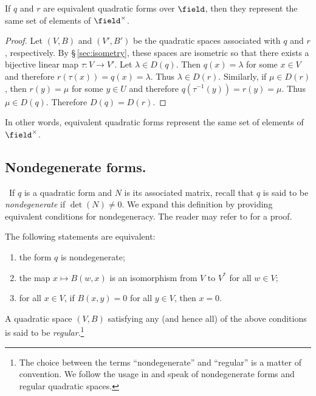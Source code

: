\begin{theorem}
  If \(q\) and \(r\) are equivalent quadratic forms over \(\field\), then they represent the same set of elements of \(\field^{\times}\).
\end{theorem}

\begin{proof}
  Let \((V, B)\) and \((V', B')\) be the quadratic spaces associated with \(q\) and \(r\), respectively. By \S\,\ref{sec:isometry}, these spaces are isometric so that there exists a bijective linear map \(\tau: V \to V'\). Let \(\lambda \in D(q)\). Then \(q(x) = \lambda\) for some \(x \in V\) and therefore \(r(\tau(x)) = q(x) = \lambda\). Thus \(\lambda \in D(r)\). Similarly, if \(\mu \in D(r)\), then \(r(y) = \mu\) for some \(y \in U\) and therefore \(q(\tau^{-1}(y)) = r(y) = \mu\). Thus \(\mu \in D(q)\). Therefore \(D(q) = D(r)\).
\end{proof}

In other words, equivalent quadratic forms represent the same set of elements of \(\field^{\times}\).

\subsection{Nondegenerate forms.}~If \(q\) is a quadratic form and \(N\) is its associated matrix, recall that \(q\) is said to be \emph{nondegenerate} if \(\det(N) \neq 0\). We expand this definition by providing equivalent conditions for nondegeneracy.\label{sec:nondegenerate} The reader may refer to \cite[p.~6]{lam1973quadratic} for a proof.

\begin{theorem}\label{thm:nondegenerate}
    The following statements are equivalent:

    \smallskip

    \begin{enumerate}[nosep, label=(\alph*)]
        \item the form \(q\) is nondegenerate;
        \item the map \(x \mapsto B(w, x)\) is an isomorphism from \(V\) to \(V^*\) for all \(w \in V\);
        \item for all \(x \in V\), if \(B(x, y) = 0\) for all \(y \in V\), then \(x = 0\).
    \end{enumerate}
\end{theorem}

A quadratic space \((V, B)\) satisfying any (and hence all) of the above conditions is said to be \emph{regular}.\footnote{The choice between the terms ``nondegenerate'' and ``regular'' is a matter of convention. We follow the usage in \cite{lam1973quadratic} and speak of nondegenerate forms and regular quadratic spaces.}

